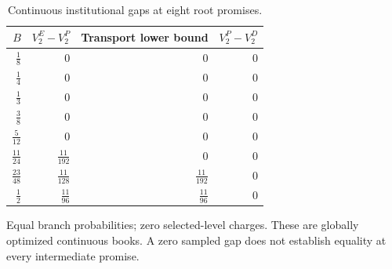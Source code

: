 \begin{table}[p]\centering\small
\caption{Continuous institutional gaps at eight root promises.}\label{tab:r42-gap}
\begin{tabular}{rrrr}\toprule
$B$ & $V_2^E-V_2^P$ & Transport lower bound & $V_2^P-V_2^D$\\\midrule
$\frac{1}{8}$ & $0$ & $0$ & $0$\\[3pt]
$\frac{1}{4}$ & $0$ & $0$ & $0$\\[3pt]
$\frac{1}{3}$ & $0$ & $0$ & $0$\\[3pt]
$\frac{3}{8}$ & $0$ & $0$ & $0$\\[3pt]
$\frac{5}{12}$ & $0$ & $0$ & $0$\\[3pt]
$\frac{11}{24}$ & $\frac{11}{192}$ & $0$ & $0$\\[3pt]
$\frac{23}{48}$ & $\frac{11}{128}$ & $\frac{11}{192}$ & $0$\\[3pt]
$\frac{1}{2}$ & $\frac{11}{96}$ & $\frac{11}{96}$ & $0$\\[3pt]
\bottomrule\end{tabular}
\par\smallskip\begin{minipage}{.96\textwidth}\footnotesize Equal branch probabilities; zero selected-level charges. These are globally optimized continuous books. A zero sampled gap does not establish equality at every intermediate promise.\end{minipage}
\end{table}\clearpage
